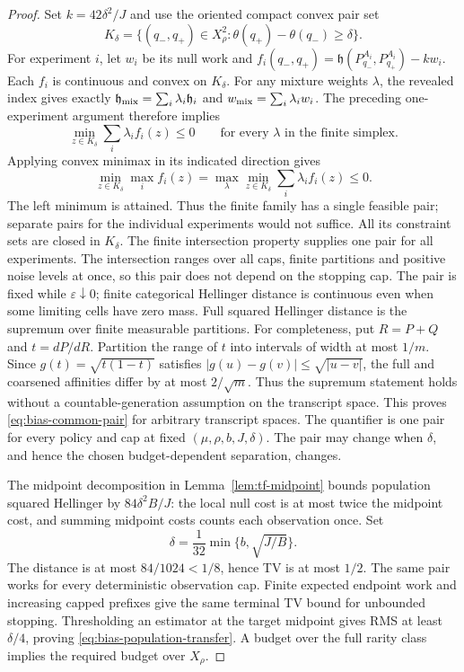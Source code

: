 \begin{proof}
Set $k=42\delta^2/J$ and use the oriented compact convex pair set
\[
 K_\delta=\{(q_-,q_+)\in X_\rho^2:
                 \theta(q_+)-\theta(q_-)\ge\delta\}.
\]
For experiment $i$, let $w_i$ be its null work and
$f_i(q_-,q_+)=\mathfrak h(P_{q_-}^{A_i},P_{q_+}^{A_i})-kw_i$.
Each $f_i$ is continuous and convex on $K_\delta$.
For any mixture weights $\lambda$, the revealed index gives exactly
$\mathfrak h_{\rm mix}=\sum_i\lambda_i\mathfrak h_i$ and $w_{\rm mix}=\sum_i\lambda_iw_i$.
The preceding one-experiment argument therefore implies
\[
 \min_{z\in K_\delta}\sum_i\lambda_i f_i(z)\le0
 \qquad\text{for every }\lambda\text{ in the finite simplex}.
\]
Applying convex minimax in its indicated direction gives
\[
 \min_{z\in K_\delta}\max_i f_i(z)
 =\max_\lambda\min_{z\in K_\delta}\sum_i\lambda_i f_i(z)\le0.
\]
The left minimum is attained. Thus the finite family has a single feasible
pair; separate pairs for the individual experiments would not suffice.
All its constraint sets are closed in $K_\delta$.
The finite intersection property supplies one pair for all experiments.
The intersection ranges over all caps, finite partitions and positive
noise levels at once, so this pair does not depend on the stopping cap.
The pair is fixed while $\varepsilon\downarrow0$; finite categorical
Hellinger distance is continuous even when some limiting cells have zero
mass. Full squared Hellinger distance is the supremum over finite
measurable partitions. For completeness, put $R=P+Q$ and $t=dP/dR$.
Partition the range of $t$ into intervals of width at most $1/m$.
Since $g(t)=\sqrt{t(1-t)}$ satisfies $|g(u)-g(v)|\le\sqrt{|u-v|}$,
the full and coarsened affinities differ by at most $2/\sqrt m$.
Thus the supremum statement holds without a countable-generation
assumption on the transcript space. This proves
\eqref{eq:bias-common-pair} for arbitrary transcript spaces.
The quantifier is one pair for every policy and cap at fixed
$(\mu,\rho,b,J,\delta)$. The pair may change when $\delta$, and hence
the chosen budget-dependent separation, changes.

The midpoint decomposition in Lemma~\ref{lem:tf-midpoint}
bounds population squared Hellinger by
\(84\delta^2B/J\): the local null cost is at most twice the midpoint
cost, and summing midpoint costs counts each observation once.  Set
\[
 \delta=\frac1{32}\min\{b,\sqrt{J/B}\}.
\]
The distance is at most \(84/1024<1/8\), hence TV is at most \(1/2\).
The same pair works for every deterministic observation cap.  Finite
expected endpoint work and increasing capped prefixes give the same
terminal TV bound for unbounded stopping.  Thresholding an estimator at
the target midpoint gives RMS at least \(\delta/4\), proving
\eqref{eq:bias-population-transfer}.  A budget over the full rarity class
implies the required budget over \(X_\rho\).
\end{proof}


